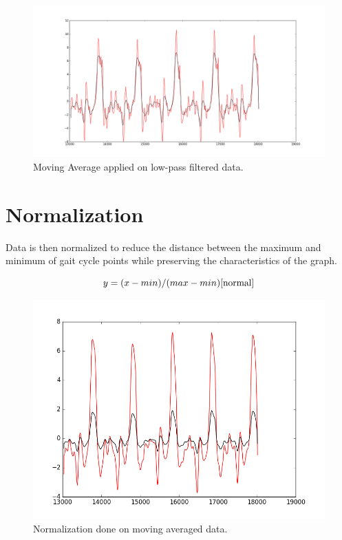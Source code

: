 \documentclass[a4paper]{report}
\begin{document}
\begin{figure}
\includegraphics[scale=0.3]{pictures/maax3.png}
\caption{Moving Average applied on low-pass filtered data.}
\end{figure}

\section{Normalization}

Data is then normalized to reduce the distance between the maximum and minimum of 
gait cycle points while preserving the characteristics of the graph.\newline

$$ y = (x - min) / (max - min)\cite{normal} $$
\begin{figure}
\includegraphics[scale=0.6]{pictures/normalized.png}
\caption{Normalization done on moving averaged data.}
\end{figure}
\end{document}
